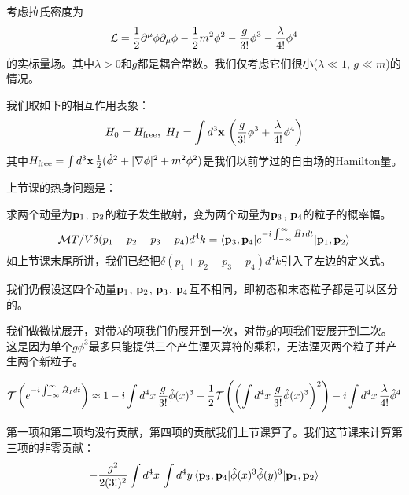 \documentclass[CJK]{beamer}
\begin{document}
\begin{frame} 
\bch
考虑拉氏密度为
$${\mathcal{L}} = \frac{1}{2}\partial^\mu\phi\partial_\mu\phi - \frac{1}{2}m^2\phi^2 - \frac{g}{3!}\phi^3- \frac{\lambda}{4!}\phi^4$$
的实标量场。其中$\lambda>0$和$g$都是耦合常数。我们仅考虑它们很小($\lambda \ll 1$, $g\ll m$)的情况。

我们取如下的相互作用表象：
$$ H_0 = H_{\rm free},\ H_I = \int d^3{\mathbf{x}}\, \left(\frac{g}{3!}\phi^3 + \frac{\lambda}{4!} \phi^4\right)$$
其中$H_{\rm free} = \int d^3{\mathbf{x}}\, \frac{1}{2}(\dot\phi^2 + |\nabla \phi|^2 + m^2\phi^2)$是我们以前学过的自由场的Hamilton量。

\ech
\end{frame}




\begin{frame} 
\bch
上节课的热身问题是：
\skipline

求两个动量为${\mathbf{p}}_1$, ${\mathbf{p}}_2$的粒子发生散射，变为两个动量为${\mathbf{p}}_3$, ${\mathbf{p}}_4$的粒子的概率幅。
$${\mathcal{M}} T/V \delta(p_1+p_2-p_3-p_4)d^4k= \langle {\mathbf{p}}_3, {\mathbf{p}}_4|  e^{-{\dot{\imath}}\int_{-\infty}^\infty \hat{H}_I dt}|{\mathbf{p}}_1,{\mathbf{p}}_2\rangle$$
如上节课末尾所讲，我们已经把$\delta(p_1+p_2-p_3-p_4)d^4k$引入了左边的定义式。
\skipline

我们仍假设这四个动量${\mathbf{p}}_1$, ${\mathbf{p}}_2$, ${\mathbf{p}}_3$, ${\mathbf{p}}_4$互不相同，即初态和末态粒子都是可以区分的。
\ech
\end{frame}

\begin{frame} 
\bch
{\small 
我们做微扰展开，对带$\lambda$的项我们仍展开到一次，对带$g$的项我们要展开到二次。这是因为单个$g\phi^3$最多只能提供三个产生湮灭算符的乘积，无法湮灭两个粒子并产生两个新粒子。

$$\mathcal{T}\left(e^{-{\dot{\imath}}\int_{-\infty}^\infty \hat{H}_I dt}\right)\approx 1-{\dot{\imath}}\int d^4x\,\frac{g}{3!}\hat\phi(x)^3 -\frac{1}{2}\mathcal{T}\left(\left(\int d^4x\,\frac{g}{3!}\hat\phi(x)^3\right)^2\right)- {\dot{\imath}}\int d^4x\, \frac{\lambda}{4!}\hat\phi^4 $$

第一项和第二项均没有贡献，第四项的贡献我们上节课算了。我们这节课来计算第三项的非零贡献：
$$ -\frac{g^2}{2(3!)^2} \int d^4x\, \int d^4y\,\langle {\mathbf{p}}_3, {\mathbf{p}}_4|  \hat\phi(x)^3 \hat\phi(y)^3 |{\mathbf{p}}_1,{\mathbf{p}}_2\rangle$$
}
\ech
\end{frame}
\end{document}
